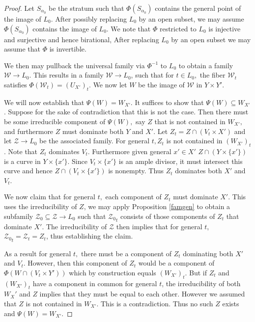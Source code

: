 \documentclass[12pt]{amsart}
\numberwithin{equation}{section}
\numberwithin{theorem}{section}
\theoremstyle{definition}
\theoremstyle{definition}
\begin{document}
\begin{proof}
Let $S_{\alpha_0}$ be the stratum such that $\Phi(S_{\alpha_0})$ contains the general point of the image of $L_0$. After possibly replacing $L_0$ by an open subset, we may assume $\Phi(S_{\alpha_0})$ contains the image of $L_0$.  We note that $\Phi$ restricted to $L_0$ is injective and surjective  and hence birational, After replacing $L_0$ by an open subset we may assume that $\Phi$ is invertible.

We then may pullback the universal family via $\Phi^{-1}$ to $L_0$ to obtain a family $\mathcal{W} \to L_0$.   This results in a family $\mathcal{W} \to L_0$, such that for $t \in L_0,$ the fiber $\mathcal{W}_t$ satisfies $\Phi(\mathcal{W}_t) = (U_{X'})_t$. We now let $W$ be the image of $\mathcal{W}$ in $Y \times Y'$.    


 We will now establish that $\Psi(W) = W_{X'}$. It suffices to show that $\Psi(W) \subseteq W_{X'}$. Suppose for the sake of contradiction that this is not the case. Then there must be some irreducible component of $\Psi(W),$ say $Z$ that is not contained in $W_{X'},$ and furthermore $Z$ must dominate both $Y$ and $X'$.
 Let $Z_t = Z \cap (V_t \times X')$ and let $\mathcal{Z} \to L_0$ be the associated family. For general $t, Z_t$ is not contained in $(W_{X'})_t$. Note that $Z_t$ dominates $V_t$. Furthermore  given general $x' \in X'$ $Z \cap (Y \times \{x'\})$ is a curve in $Y \times \{x'\}$. Since $V_t \times \{x'\}$ is an ample divisor, it must intersect this curve and hence $Z \cap (V_t \times \{x'\})$ is nonempty. Thus $Z_t$ dominates both $X'$ and $V_t$.

 We now claim that for general $t,$ each component of $Z_t$ must dominate $X'$. This uses the irreducibility of $Z$, we may apply Proposition \ref{famgen} to obtain a subfamily $\mathcal{Z}_0 \subseteq \mathcal{Z} \to L_0$ such that $\mathcal{Z_0}_t$ consists of those components of $Z_t$ that dominate $X'$. The irreducibility of $\mathcal{Z}$ then implies that for general $t$, $\mathcal{Z_0}_t = \mathcal{Z}_t = Z_t$, thus establishing the claim.

 As a result for general $t,$ there must be a component of $Z_t$ dominating both $X'$ and $V_t.$ However, then this component of $Z_t$ would be a component of $\Phi(W \cap  (V_t \times Y'))$ which by construction equals $ (W_{X'})_t$. But if $Z_t$ and  $(W_{X'})_t$ have a component in common for general $t$, the irreducibility of both $W_X'$ and $Z$ implies that they must be equal to each other. However we assumed that $Z$ is not contained in $W_{X'}.$ This is a contradiction. Thus no such $Z$ exists and $\Psi(W) = W_{X'}.$
 

 

    \end{proof}
\end{document}
